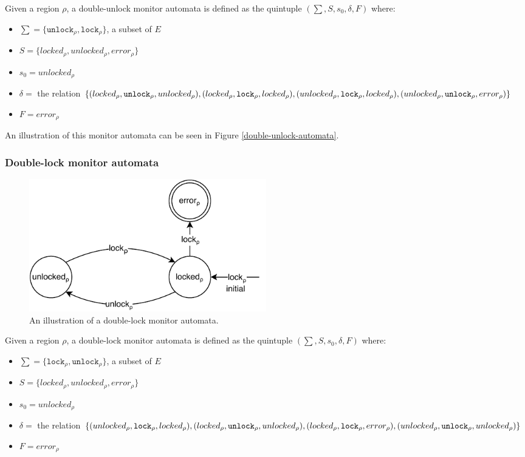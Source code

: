 Given a region $\rho$, a double-unlock monitor automata is defined as the quintuple $(\sum, S, s_0, \delta, F)$ where: 

\begin{itemize}
    \item $\sum = \{\texttt{unlock}_\rho, \texttt{lock}_\rho\}$, a subset of $E$
    \item $S = \{ locked_\rho, unlocked_\rho, error_\rho \}$
    \item $s_0 = unlocked_\rho$ 
    \item $\delta =$ the relation $\{(locked_\rho, \texttt{unlock}_\rho, unlocked_\rho), (locked_\rho, \texttt{lock}_\rho, locked_\rho), \\
        (unlocked_\rho, \texttt{lock}_\rho, locked_\rho), (unlocked_\rho, \texttt{unlock}_\rho, error_\rho)\}$ 
    \item $F = error_\rho$  
\end{itemize}

An illustration of this monitor automata can be seen in Figure \ref{double-unlock-automata}. 

\subsubsection{Double-lock monitor automata}

\begin{figure}[H]
    \centering
    \includegraphics[width=0.5\textwidth]{background/figures/double-lock}
    \caption{An illustration of a double-lock monitor automata.}
    \label{double-lock-automata}
\end{figure}

Given a region $\rho$, a double-lock monitor automata is defined as the quintuple $(\sum, S, s_0, \delta, F)$ where: 

\begin{itemize}
    \item $\sum = \{\texttt{lock}_\rho, \texttt{unlock}_\rho\}$, a subset of $E$
    \item $S = \{ locked_\rho, unlocked_\rho, error_\rho \}$
    \item $s_0 = unlocked_\rho$ 
    \item $\delta =$ the relation $\{(unlocked_\rho, \texttt{lock}_\rho, locked_\rho), (locked_\rho, \texttt{unlock}_\rho, unlocked_\rho), \\
    (locked_\rho, \texttt{lock}_\rho, error_\rho), (unlocked_\rho, \texttt{unlock}_\rho, unlocked_\rho)\}$ 
    \item $F = error_\rho$  
\end{itemize}

